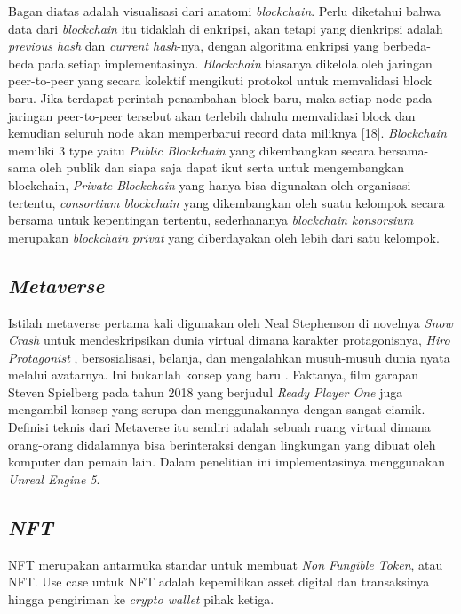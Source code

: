 Bagan diatas adalah visualisasi dari anatomi \emph{blockchain}. Perlu diketahui
bahwa data dari \emph{blockchain} itu tidaklah di enkripsi, akan tetapi yang dienkripsi adalah
\emph{previous hash} dan \emph{current hash}-nya, dengan algoritma enkripsi yang berbeda-beda pada setiap implementasinya.
\emph{Blockchain} biasanya dikelola oleh jaringan
peer-to-peer yang secara kolektif mengikuti protokol untuk
memvalidasi block baru. Jika terdapat perintah penambahan block baru,
maka setiap node pada jaringan peer-to-peer tersebut akan terlebih
dahulu memvalidasi block dan kemudian seluruh node akan memperbarui record data miliknya [18]. \emph{Blockchain} memiliki 3 type \parencite{url:blockchaintype}
yaitu \emph{Public Blockchain} yang dikembangkan secara bersama-sama
oleh publik dan siapa saja dapat ikut serta untuk mengembangkan
blockchain, \emph{Private Blockchain} yang hanya bisa digunakan oleh
organisasi tertentu, \emph{consortium blockchain} yang dikembangkan oleh
suatu kelompok secara bersama untuk kepentingan tertentu,
sederhananya \emph{blockchain konsorsium} merupakan \emph{blockchain privat} yang
diberdayakan oleh lebih dari satu kelompok.

\subsection{\emph{Metaverse}}

Istilah metaverse pertama kali digunakan oleh Neal Stephenson di novelnya \emph{Snow Crash} untuk
mendeskripsikan dunia virtual dimana karakter protagonisnya, \emph{Hiro Protagonist}
, bersosialisasi, belanja, dan mengalahkan musuh-musuh dunia nyata melalui avatarnya. Ini bukanlah konsep yang baru
. Faktanya, film garapan Steven Spielberg pada tahun 2018 yang berjudul \emph{Ready Player One} juga mengambil konsep yang serupa dan
menggunakannya dengan sangat ciamik. Definisi teknis dari Metaverse itu sendiri adalah sebuah ruang virtual dimana orang-orang didalamnya bisa berinteraksi
dengan lingkungan yang dibuat oleh komputer dan pemain lain. Dalam penelitian ini implementasinya menggunakan
\emph{Unreal Engine 5}.

\subsection{\emph{NFT}}
NFT merupakan antarmuka standar untuk membuat \emph{Non Fungible Token}, atau NFT.
Use case untuk NFT adalah kepemilikan asset digital dan transaksinya hingga pengiriman ke
\emph{crypto wallet} pihak ketiga.

